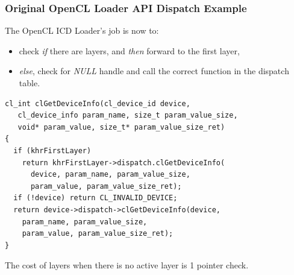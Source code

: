 \documentclass[
    ignorenonframetext,
  ]{beamer}
\begin{document}


\begin{frame}[fragile]
  \frametitle{Original OpenCL Loader API Dispatch Example}
  The OpenCL ICD Loader's job is now to:
  \begin{itemize}
    \item check \textit{if} there are layers, and \textit{then} forward to the
          first layer,
    \item \textit{else}, check for \textit{NULL} handle and call the correct
          function in the dispatch table.
  \end{itemize}
  \tiny
  \begin{verbatim}
cl_int clGetDeviceInfo(cl_device_id device,
   cl_device_info param_name, size_t param_value_size,
   void* param_value, size_t* param_value_size_ret)
{
  if (khrFirstLayer)
    return khrFirstLayer->dispatch.clGetDeviceInfo(
      device, param_name, param_value_size,
      param_value, param_value_size_ret);
  if (!device) return CL_INVALID_DEVICE;
  return device->dispatch->clGetDeviceInfo(device,
    param_name, param_value_size,
    param_value, param_value_size_ret);
}
\end{verbatim}
\normalsize
The cost of layers when there is no active layer is 1 pointer check.
\end{frame}
\end{document}
